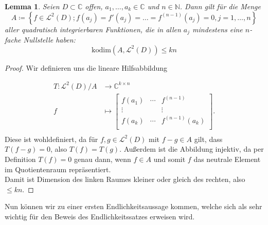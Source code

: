 \documentclass[11pt,a4paper]{scrartcl}
\theoremstyle{thm}
\newtheorem{lemma}{Lemma}[section]
\theoremstyle{def}
\theoremstyle{remark}
\begin{document}
\begin{lemma}
Seien $D\subset\mathbb{C}$ offen, $a_1,\ldots,a_k\in\mathbb{C}$ und $n\in\mathbb{N}$. Dann gilt für die Menge \[A\coloneqq \left\{ f\in \mathcal{L}^2(D); f(a_j)=f'(a_j)=\ldots=f^{(n-1)}(a_j)= 0,  j=1,\ldots,n\right\}\]
aller quadratisch integrierbaren Funktionen, die in allen $a_j$ mindestens eine $n$- fache Nullstelle haben:
\[ \mathrm{kodim}(A,\mathcal{L}^2(D))\leq kn 
\]
\end{lemma}
\begin{proof}
Wir definieren uns die lineare Hilfsabbildung

\begin{align*}
T:\mathcal{L}^2(D)/A 	&\longrightarrow 	\mathbb{C}^{k\times n}\\
  f 					&\longmapsto 			     \begin{bmatrix}
  													f(a_1) &\cdots & f^{(n-1)}\\
  													\vdots & &\vdots\\
  													f(a_k) &\cdots & f^{(n-1)}(a_k)\\
													\end{bmatrix}. \\
\end{align*} 
Diese ist wohldefiniert, da für $f,g\in \mathcal{L}^2(D)$ mit $f-g\in A$ gilt, dass $T(f-g)=0$, also $T(f)=T(g)$. Außerdem ist die Abbildung injektiv, da per Definition $T(f)=0$ genau dann, wenn $f\in A$ und somit $f$ das neutrale Element im Quotientenraum repräsentiert.
\\ Damit ist Dimension des linken Raumes kleiner oder gleich des rechten, also $\leq kn$.
\end{proof}

Nun können wir zu einer ersten Endlichkeitsaussage kommen, welche sich als sehr wichtig für den Beweis des Endlichkeitssatzes erweisen wird.
\end{document}
